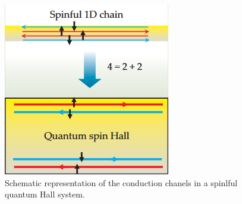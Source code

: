 \begin{figure}[h!]
    \includegraphics[scale = 0.7]{sections/visuel/spinful.png}
    \caption{Schematic representation of the conduction chanels in a spinlful quantum Hall system.}
    \label{spinful}
\end{figure}

